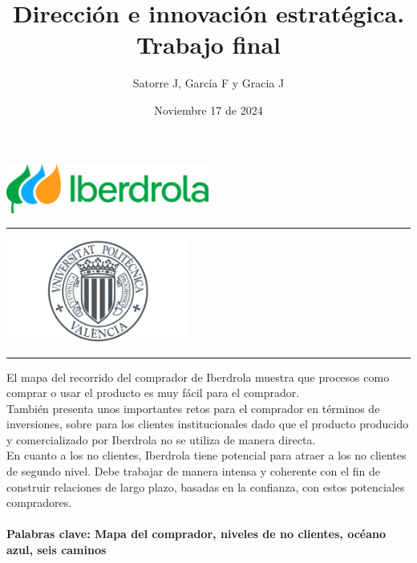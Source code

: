 \documentclass{article}
\title{ \textbf{Dirección e innovación estratégica.\\} Trabajo final}
\author{Satorre J, García F y Gracia J}
\date{Noviembre 17 de 2024}
\begin{document}
\thispagestyle{empty}

\maketitle
\begin{center}
    \includegraphics[width=0.5\textwidth]{Logo_Iberdrola_(2023).svg.png} \\ %
    
\end{center}
\rule{\linewidth}{0.2mm}
\begin{center}
    \includegraphics[width=0.45\textwidth]{UPV-Emblem.png} \\ 
\end{center}
\rule{\linewidth}{0.2mm}
\begin{tcolorbox}[colback=yellow!15!white, colframe=green!30!black, title=\textbf{Resumen}]
El mapa del recorrido del comprador de Iberdrola muestra que procesos como comprar o usar el producto es muy fácil para el comprador. 
\\

También presenta unos importantes retos para el comprador en términos de inversiones, sobre para los clientes institucionales dado que el producto producido y comercializado por Iberdrola no se utiliza de manera directa. 
\\

En cuanto a los no clientes, Iberdrola tiene potencial para atraer a los no clientes de segundo nivel. Debe trabajar de manera intensa y coherente con el fin de construir relaciones de largo plazo, basadas en la confianza, con estos potenciales compradores. 
\\
\dotfill
\\

\textbf{Palabras clave: Mapa del comprador, niveles de no clientes, océano azul, seis caminos} 
\end{tcolorbox}
\end{document}
